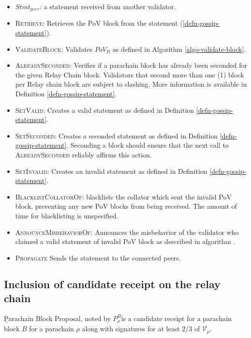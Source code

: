 \begin{itemize}
  \item $Stmt_{peer}$: a statement received from another validator.
  \item \textsc{Retrieve}: Retrieves the PoV block from the statement (\ref{defn-gossip-statement}).
  \item \textsc{ValidateBlock}: Validates $PoV_B$ as defined in Algorithm
  \ref{algo-validate-block}.
  \item \textsc{AlreadySeconded}: Verifies if a parachain block has already been
  seconded for the given Relay Chain block. Validators that second more than one
  (1) block per Relay chain block are subject to slashing. More information is
  available in Definition \ref{defn-gossip-statement}.
  \item \textsc{SetValid}: Creates a valid statement as defined in Definition
  \ref{defn-gossip-statement}.
  \item \textsc{SetSeconded}: Creates a seconded statement as defined in
  Definition \ref{defn-gossip-statement}. Seconding a block should ensure that
  the next call to \textsc{AlreadySeconded} reliably affirms this action.
  \item \textsc{SetInvalid}: Creates an invalid statement as defined in
  Definition \ref{defn-gossip-statement}.
  \item \textsc{BlacklistCollatorOf}: blacklists the collator which sent the
  invalid PoV block, preventing any new PoV blocks from being received. The
  amount of time for blacklisting is unspecified.
  \item \textsc{AnnounceMisbehaviorOf}: Announces the misbehavior of the validator who claimed a valid statement of invalid PoV block as described in algorithm .
  \item \textsc{Propagate} Sends the statement to the connected peers.
\end{itemize}

\subsection{Inclusion of candidate receipt on the relay chain}\label{sect-inclusion-of-candidate-receipt}

\begin{definition}
  \label{defn-para-proposal}
        {\b Parachain Block Proposal}, noted by $P^B_{\rho}$is a candidate receipt for a parachain block $B$ for a parachain $\rho$ along with signatures for at least 2/3 of $\mathcal{V}_\rho$.  %

\end{definition}

